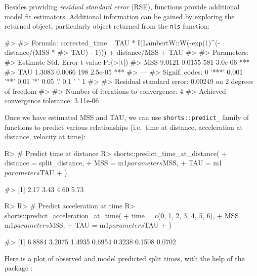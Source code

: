 \documentclass[
]{jss}
\begin{document}
Besides providing \emph{residual standard error} (RSE),  functions provide additional model fit estimators. Additional information can be gained by exploring the returned object, particularly object returned from the \texttt{nls} function:

\begin{CodeChunk}
\begin{CodeOutput}
#> 
#> Formula: corrected_time ~ TAU * I(LambertW::W(-exp(1)^(-distance/(MSS * 
#>     TAU) - 1))) + distance/MSS + TAU
#> 
#> Parameters:
#>     Estimate Std. Error t value Pr(>|t|)    
#> MSS   9.0121     0.0155     581  3.0e-06 ***
#> TAU   1.3083     0.0066     198  2.5e-05 ***
#> ---
#> Signif. codes:  0 '***' 0.001 '**' 0.01 '*' 0.05 '.' 0.1 ' ' 1
#> 
#> Residual standard error: 0.00249 on 2 degrees of freedom
#> 
#> Number of iterations to convergence: 4 
#> Achieved convergence tolerance: 3.11e-06
\end{CodeOutput}
\end{CodeChunk}

Once we have estimated MSS and TAU, we can use \texttt{shorts::predict\_} family of functions to predict various relationships (i.e.~time at distance, acceleration at distance, velocity at time):

\begin{CodeChunk}
\begin{CodeInput}
R> # Predict time at distance
R> shorts::predict_time_at_distance(
+   distance = split_distance,
+   MSS = m1$parameters$MSS,
+   TAU = m1$parameters$TAU
+ )
\end{CodeInput}
\begin{CodeOutput}
#> [1] 2.17 3.43 4.60 5.73
\end{CodeOutput}
\begin{CodeInput}
R> 
R> # Predict acceleration at time
R> shorts::predict_acceleration_at_time(
+   time = c(0, 1, 2, 3, 4, 5, 6),
+   MSS = m1$parameters$MSS,
+   TAU = m1$parameters$TAU
+ )
\end{CodeInput}
\begin{CodeOutput}
#> [1] 6.8884 3.2075 1.4935 0.6954 0.3238 0.1508 0.0702
\end{CodeOutput}
\end{CodeChunk}

Here is a plot of observed and model predicted split times, with the help of the  package \citep{R-ggplot2}:
\end{document}
